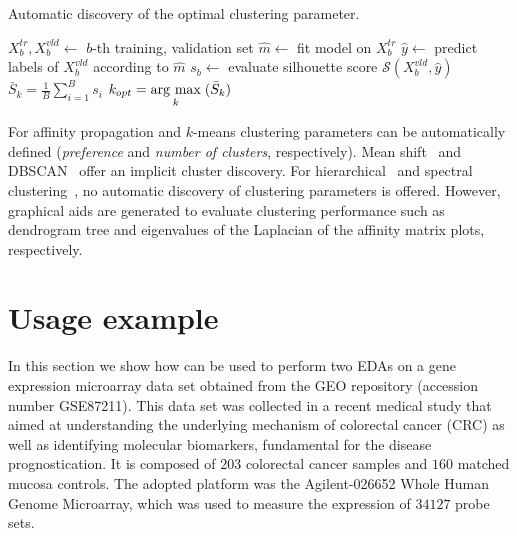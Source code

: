 \begin{algorithm}[]
  \caption{{\footnotesize Automatic discovery of the optimal clustering parameter.}}\label{alg:clusters}
    \footnotesize
    \begin{algorithmic}[1]
              \State $X^{tr}_b,X^{vld}_b\leftarrow$ $b$-th training, validation set
              \State $\hat{m}\leftarrow$ fit model on $X^{tr}_b$
              \State $\hat{y}\leftarrow$ predict labels of $X^{vld}_b$ according to $\hat{m}$
              \State $s_b\leftarrow$ evaluate silhouette score  $\mathcal{S}(X^{vld}_b,\hat{y})$
        \EndFor
        \State $\bar{S}_k = \frac{1}{B}\sum_{i=1}^B s_i$
        \EndFor
        \State $k_{opt} = \underset{k}{\operatorname{arg}\,\operatorname{max}}\;(\bar{S}_k)$
    \end{algorithmic}
\end{algorithm}

For affinity propagation \cite{frey2007clustering} and $k$-means \cite{bishop2006pattern} clustering parameters can be automatically defined (\emph{preference} and \emph{number of clusters}, respectively).
Mean shift~\cite{comaniciu2002mean} and DBSCAN~\cite{ester1996density} offer an implicit cluster discovery.
For hierarchical~\cite{friedman2001elements} and spectral clustering~\cite{shi2000normalized}, no automatic discovery of clustering parameters is offered. However, graphical aids are generated to evaluate clustering performance such as dendrogram tree and eigenvalues of the Laplacian of the affinity matrix plots, respectively.

\section{Usage example} \label{sec:usage_example}
In this section we show how \ade can be used to perform two EDAs on a gene expression microarray data set obtained from the GEO repository (accession number GSE87211).
This data set was collected in a recent medical study that aimed at understanding the underlying mechanism of colorectal cancer (CRC) as well as identifying molecular biomarkers, fundamental for the disease prognostication.
It is composed of $203$ colorectal cancer samples and $160$ matched mucosa controls. The adopted platform was the Agilent-026652 Whole Human Genome Microarray, which was used to measure the expression of $34127$ probe sets.

